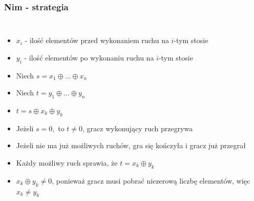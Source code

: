 \documentclass[polish,envcountsect,10pt]{beamer}
\begin{document}
                \begin{frame}
                    \frametitle{Nim - strategia}
                    \begin{columns}
                            \begin{itemize}
                                \item<1-> $x_i$ - ilość elementów przed wykonaniem ruchu na $i$-tym stosie
                                \item<1-> $y_i$ - ilość elementów po wykonaniu ruchu na $i$-tym stosie
                                \item<1-> Niech $s = x_1 \oplus ... \oplus x_n$
                                \item<1-> Niech $t = y_1 \oplus ... \oplus y_n$
                                \item<1-> $t = s \oplus x_k \oplus y_k$
                                \item<2-> Jeżeli $s = 0,$ to $t \neq 0$, gracz wykonujący ruch przegrywa
                                \item<3-> Jeżeli nie ma już możliwych ruchów, gra się kończyła i gracz już przegrał
                                \item<4-> Każdy możliwy ruch sprawia, że $t = x_k \oplus y_k$
                                \item<5-> $x_k \oplus y_k \neq 0$, ponieważ gracz musi pobrać niezerową liczbę elementów, więc $x_k \neq y_k$
                            \end{itemize}
                    \end{columns}
                \end{frame}
\end{document}
